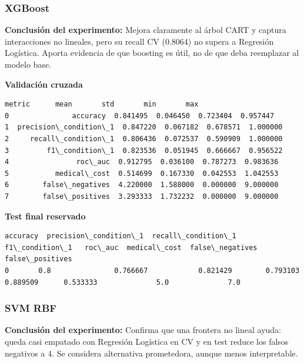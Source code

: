 \documentclass[11pt]{article}
\begin{document}
    
    \subsubsection{XGBoost}\label{xgboost}

    
    \textbf{Conclusión del experimento:} Mejora claramente al árbol CART y
captura interacciones no lineales, pero su recall CV (0.8064) no supera
a Regresión Logística. Aporta evidencia de que boosting es útil, no de
que deba reemplazar al modelo base.

    
    \textbf{Validación cruzada}

    
    
    \begin{Verbatim}[commandchars=\\\{\}]
                  metric      mean       std       min       max
0               accuracy  0.841495  0.046450  0.723404  0.957447
1  precision\_condition\_1  0.847220  0.067182  0.678571  1.000000
2     recall\_condition\_1  0.806436  0.072537  0.590909  1.000000
3         f1\_condition\_1  0.823536  0.051945  0.666667  0.956522
4                roc\_auc  0.912795  0.036100  0.787273  0.983636
5           medical\_cost  0.514699  0.167330  0.042553  1.042553
6        false\_negatives  4.220000  1.588000  0.000000  9.000000
7        false\_positives  3.293333  1.732232  0.000000  9.000000
    \end{Verbatim}

    
    \textbf{Test final reservado}

    
    
    \begin{Verbatim}[commandchars=\\\{\}]
   accuracy  precision\_condition\_1  recall\_condition\_1  f1\_condition\_1   roc\_auc  medical\_cost  false\_negatives  false\_positives
0       0.8               0.766667            0.821429        0.793103  0.889509      0.533333              5.0              7.0
    \end{Verbatim}

    
    \subsubsection{SVM RBF}\label{svm-rbf}

    
    \textbf{Conclusión del experimento:} Confirma que una frontera no lineal
ayuda: queda casi empatado con Regresión Logística en CV y en test
reduce los falsos negativos a 4. Se considera alternativa prometedora,
aunque menos interpretable.
\end{document}
